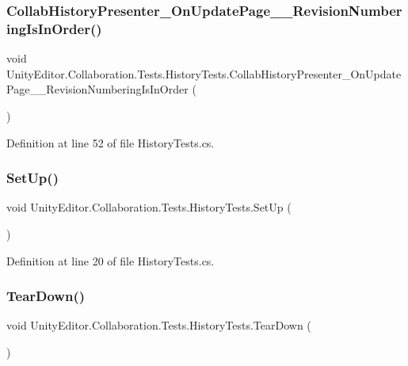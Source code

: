 \subsubsection{\texorpdfstring{CollabHistoryPresenter\_OnUpdatePage\_\_RevisionNumberingIsInOrder()}{CollabHistoryPresenter\_OnUpdatePage\_\_RevisionNumberingIsInOrder()}}
{\footnotesize\ttfamily void Unity\+Editor.\+Collaboration.\+Tests.\+History\+Tests.\+Collab\+History\+Presenter\+\_\+\+On\+Update\+Page\+\_\+\+\_\+\+Revision\+Numbering\+Is\+In\+Order (\begin{DoxyParamCaption}{ }\end{DoxyParamCaption})}



Definition at line 52 of file History\+Tests.\+cs.

\mbox{\label{class_unity_editor_1_1_collaboration_1_1_tests_1_1_history_tests_a0de6dabc680e9f81db2fa178d28b468b}} 
\subsubsection{\texorpdfstring{SetUp()}{SetUp()}}
{\footnotesize\ttfamily void Unity\+Editor.\+Collaboration.\+Tests.\+History\+Tests.\+Set\+Up (\begin{DoxyParamCaption}{ }\end{DoxyParamCaption})}



Definition at line 20 of file History\+Tests.\+cs.

\mbox{\label{class_unity_editor_1_1_collaboration_1_1_tests_1_1_history_tests_a024058e10acbe18cb317bf9523344f1d}} 
\subsubsection{\texorpdfstring{TearDown()}{TearDown()}}
{\footnotesize\ttfamily void Unity\+Editor.\+Collaboration.\+Tests.\+History\+Tests.\+Tear\+Down (\begin{DoxyParamCaption}{ }\end{DoxyParamCaption})}



